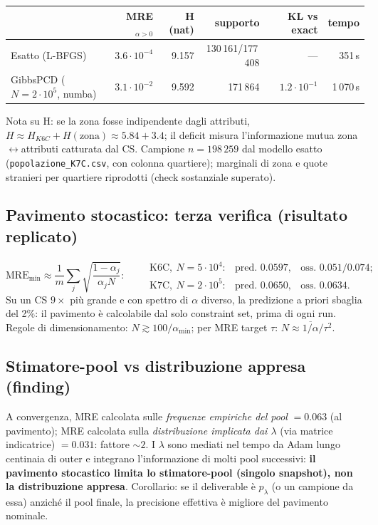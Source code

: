 \documentclass[11pt,a4paper]{article}
\newcommand{\code}[1]{\texttt{#1}}
\begin{document}
\begin{center}
\small
\begin{tabular}{@{}lrrrrr@{}}
\toprule
 & \textbf{MRE}$_{\alpha>0}$ & \textbf{H (nat)} & \textbf{supporto} & \textbf{KL vs exact} & \textbf{tempo}\\
\midrule
Esatto (L-BFGS) & $3.6\cdot10^{-4}$ & 9.157 & 130\,161/177\,408 & --- & 351\,s\\
GibbsPCD ($N{=}2\cdot10^5$, numba) & $3.1\cdot10^{-2}$ & 9.592 & 171\,864 & $1.2\cdot10^{-1}$ & 1\,070\,s\\
\bottomrule
\end{tabular}
\end{center}
\noindent Nota su H: se la zona fosse indipendente dagli attributi,
$H \approx H_{K6C} + H(\text{zona}) \approx 5.84 + 3.4$; il deficit misura
l'informazione mutua zona$\leftrightarrow$attributi catturata dal CS.
Campione $n=198\,259$ dal modello esatto (\code{popolazione\_K7C.csv}, con
colonna quartiere); marginali di zona e quote stranieri per quartiere
riprodotti (check sostanziale superato).

\subsection{Pavimento stocastico: terza verifica (risultato replicato)}
\[
\text{MRE}_{\min} \approx \frac{1}{m}\sum_j
\sqrt{\frac{1-\alpha_j}{\alpha_j N}}:
\qquad
\begin{array}{lll}
\text{K6C},\ N{=}5\cdot10^4: & \text{pred.\ }0.0597, & \text{oss.\ }0.051/0.074;\\
\text{K7C},\ N{=}2\cdot10^5: & \text{pred.\ }0.0650, & \text{oss.\ }0.0634.
\end{array}
\]
Su un CS $9\times$ pi\`u grande e con spettro di $\alpha$ diverso, la
predizione a priori sbaglia del 2\%: il pavimento \`e calcolabile dal solo
constraint set, prima di ogni run. Regole di dimensionamento:
$N \gtrsim 100/\alpha_{\min}$; per MRE target $\tau$:
$N \approx \overline{1/\alpha}/\tau^2$.

\subsection{Stimatore-pool vs distribuzione appresa (finding)}
\label{sec:estimator}
A convergenza, MRE calcolata sulle \emph{frequenze empiriche del pool}
$=0.063$ (al pavimento); MRE calcolata sulla \emph{distribuzione implicata
dai $\lambda$} (via matrice indicatrice) $=0.031$: fattore $\sim2$. I
$\lambda$ sono mediati nel tempo da Adam lungo centinaia di outer e integrano
l'informazione di molti pool successivi: \textbf{il pavimento stocastico
limita lo stimatore-pool (singolo snapshot), non la distribuzione appresa}.
Corollario: se il deliverable \`e $p_\lambda$ (o un campione da essa) anzich\'e
il pool finale, la precisione effettiva \`e migliore del pavimento nominale.
\end{document}
